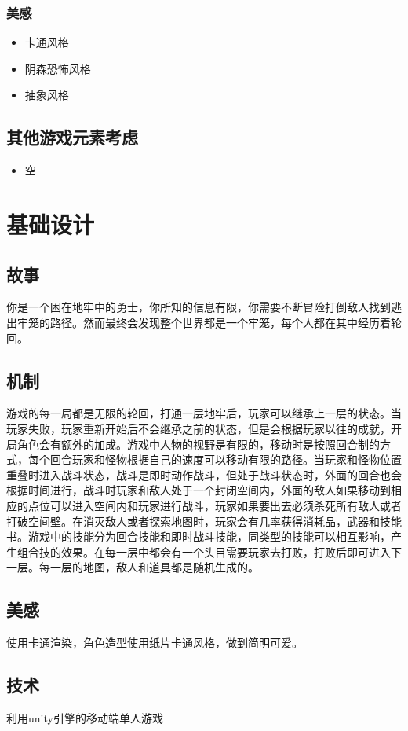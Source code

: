 ﻿\documentclass{article}
\begin{document}
\subsubsection{美感}
\begin{itemize}
	\item 卡通风格
	\item 阴森恐怖风格
	\item 抽象风格
\end{itemize}
\subsection{其他游戏元素考虑}
\begin{itemize}
	\item 空
\end{itemize}

\section{基础设计}
\subsection{故事}
你是一个困在地牢中的勇士，你所知的信息有限，你需要不断冒险打倒敌人找到逃出牢笼的路径。然而最终会发现整个世界都是一个牢笼，每个人都在其中经历着轮回。
\subsection{机制}
游戏的每一局都是无限的轮回，打通一层地牢后，玩家可以继承上一层的状态。当玩家失败，玩家重新开始后不会继承之前的状态，但是会根据玩家以往的成就，开局角色会有额外的加成。游戏中人物的视野是有限的，移动时是按照回合制的方式，每个回合玩家和怪物根据自己的速度可以移动有限的路径。当玩家和怪物位置重叠时进入战斗状态，战斗是即时动作战斗，但处于战斗状态时，外面的回合也会根据时间进行，战斗时玩家和敌人处于一个封闭空间内，外面的敌人如果移动到相应的点位可以进入空间内和玩家进行战斗，玩家如果要出去必须杀死所有敌人或者打破空间壁。在消灭敌人或者探索地图时，玩家会有几率获得消耗品，武器和技能书。游戏中的技能分为回合技能和即时战斗技能，同类型的技能可以相互影响，产生组合技的效果。在每一层中都会有一个头目需要玩家去打败，打败后即可进入下一层。每一层的地图，敌人和道具都是随机生成的。
\subsection{美感}
使用卡通渲染，角色造型使用纸片卡通风格，做到简明可爱。
\subsection{技术}
利用unity引擎的移动端单人游戏
\end{document}
